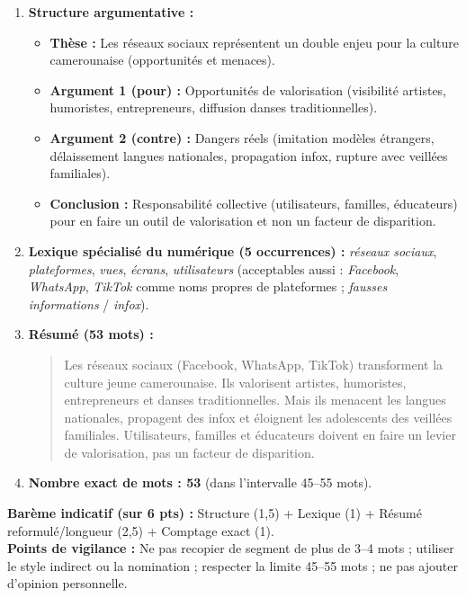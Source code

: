 \documentclass[11pt]{article}
\begin{document}
\begin{corrige}
\begin{enumerate}
\item \textbf{Structure argumentative :}
\begin{itemize}
\item \textbf{Thèse :} Les réseaux sociaux représentent un double enjeu pour la culture camerounaise (opportunités et menaces).
\item \textbf{Argument 1 (pour) :} Opportunités de valorisation (visibilité artistes, humoristes, entrepreneurs, diffusion danses traditionnelles).
\item \textbf{Argument 2 (contre) :} Dangers réels (imitation modèles étrangers, délaissement langues nationales, propagation infox, rupture avec veillées familiales).
\item \textbf{Conclusion :} Responsabilité collective (utilisateurs, familles, éducateurs) pour en faire un outil de valorisation et non un facteur de disparition.
\end{itemize}
\item \textbf{Lexique spécialisé du numérique (5 occurrences) :} \emph{réseaux sociaux}, \emph{plateformes}, \emph{vues}, \emph{écrans}, \emph{utilisateurs} (acceptables aussi : \emph{Facebook}, \emph{WhatsApp}, \emph{TikTok} comme noms propres de plateformes ; \emph{fausses informations} / \emph{infox}).
\item \textbf{Résumé (53 mots) :}
\begin{quote}
Les réseaux sociaux (Facebook, WhatsApp, TikTok) transforment la culture jeune camerounaise. Ils valorisent artistes, humoristes, entrepreneurs et danses traditionnelles. Mais ils menacent les langues nationales, propagent des infox et éloignent les adolescents des veillées familiales. Utilisateurs, familles et éducateurs doivent en faire un levier de valorisation, pas un facteur de disparition.
\end{quote}
\item \textbf{Nombre exact de mots : 53} (dans l'intervalle 45–55 mots).
\end{enumerate}
\medskip
\textbf{Barème indicatif (sur 6 pts) :} Structure (1,5) + Lexique (1) + Résumé reformulé/longueur (2,5) + Comptage exact (1).\\
\textbf{Points de vigilance :} Ne pas recopier de segment de plus de 3–4 mots ; utiliser le style indirect ou la nomination ; respecter la limite 45–55 mots ; ne pas ajouter d'opinion personnelle.
\end{corrige}
\end{document}
